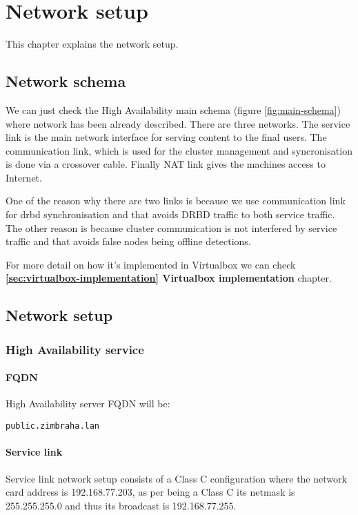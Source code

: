 

\chapter{Network setup}
\label{chap:network-setup}
This chapter explains the network setup.

\section {Network schema}
We can just check the High Availability main schema (figure \ref{fig:main-schema}) where network has been already described. There are three networks. The service link is the main network interface for serving content to the final users. The communication link, which is used for the cluster management and syncronisation is done via a crossover cable. Finally NAT link gives the machines access to Internet.

One of the reason why there are two links is because we use communication link for drbd synchronisation and that avoids DRBD traffic to both service traffic. The other reason is because cluster communication is not interfered by service traffic and that avoids false nodes being offline detections.

For more detail on how it's implemented in Virtualbox we can check \textbf{\ref{sec:virtualbox-implementation} Virtualbox implementation} chapter.

\section {Network setup}

\subsection {High Availability service}
\subsubsection {FQDN}
High Availability server FQDN will be:
\begin{verbatim}
public.zimbraha.lan
\end{verbatim}

\subsubsection {Service link}
Service link network setup consists of a Class C configuration where the network card address is 192.168.77.203, as per being a Class C its netmask is 255.255.255.0 and thus its broadcast is 192.168.77.255.

